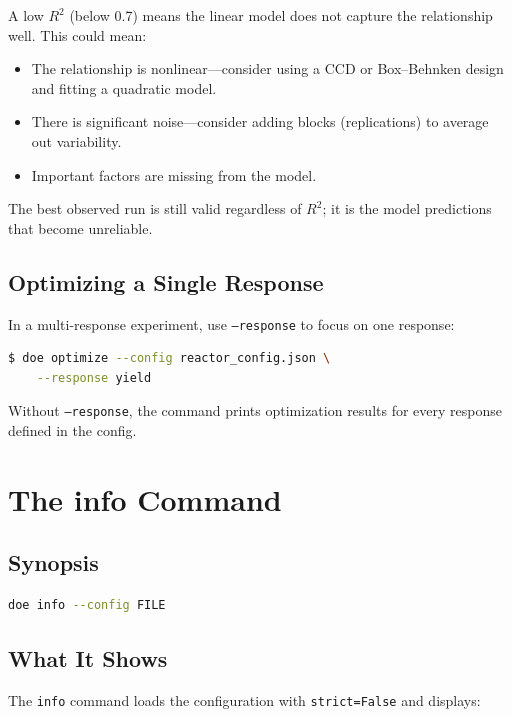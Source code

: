 \documentclass[11pt]{book}
\begin{document}
\begin{keypoint}
A low $R^2$ (below 0.7) means the linear model does not capture the relationship well. This could mean:
\begin{itemize}[nosep]
  \item The relationship is nonlinear---consider using a CCD or Box--Behnken design and fitting a quadratic model.
  \item There is significant noise---consider adding blocks (replications) to average out variability.
  \item Important factors are missing from the model.
\end{itemize}
The best observed run is still valid regardless of $R^2$; it is the model predictions that become unreliable.
\end{keypoint}

\section{Optimizing a Single Response}

In a multi-response experiment, use \texttt{--response} to focus on one response:

\begin{lstlisting}[language=bash]
$ doe optimize --config reactor_config.json \
    --response yield
\end{lstlisting}

Without \texttt{--response}, the command prints optimization results for every response defined in the config.


\chapter{The info Command}
\label{ch:info}

\section{Synopsis}

\begin{lstlisting}[language=bash]
doe info --config FILE
\end{lstlisting}

\section{What It Shows}

The \texttt{info} command loads the configuration with \texttt{strict=False} and displays:
\end{document}
